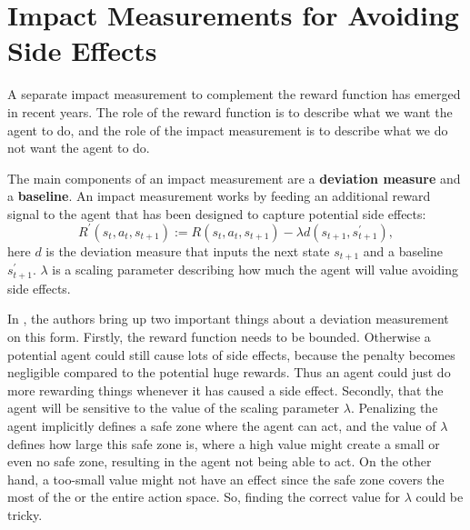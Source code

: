 \documentclass[12pt,A4]{report}
\newcommand{\autobaj}{}
\theoremstyle{definition}
\begin{document}
\section{Impact Measurements for Avoiding Side Effects}

A separate impact measurement to complement the reward function has emerged in recent years. The role of the reward function is to describe what we want the agent to do, and the role of the impact measurement is to describe what we do not want the agent to do. 

The main components of an impact measurement are a \textbf{deviation measure} and a \textbf{baseline}. An impact measurement works by feeding an additional reward signal to the agent that has been designed to capture potential side effects:
\[ R^\prime(s_t, a_t, s_{t+1}) := R(s_t, a_t, s_{t+1}) - \lambda d(s_{t+1
}, s_{t+1}^\prime), \]
here $d$ is the deviation measure that inputs the next state $s_{t+1}$ and a baseline $s_{t+1}^\prime$. $\lambda$ is a scaling parameter describing how much the agent will value avoiding side effects.

In \citet{ArmstrongLevinstein}, the authors bring up two important things about a deviation measurement on this form. Firstly, the reward function needs to be bounded. Otherwise a potential agent could still cause lots of side effects, because the penalty becomes negligible compared to the potential huge rewards. Thus an agent could just do more rewarding things whenever it has caused a side effect. Secondly, that the agent will be sensitive to the value of the scaling parameter $\lambda$. Penalizing the agent implicitly defines a safe zone where the agent can act, and the value of $\lambda$ defines how large this safe zone is, where a high value might create a small or even no safe zone, resulting in the agent not being able to act. On the other hand, a too-small value might not have an effect since the safe zone covers the most of the or the entire action space. So, finding the correct value for $\lambda$ could be tricky. 


\end{document}
